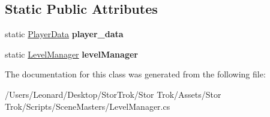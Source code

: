 \subsection*{Static Public Attributes}
\begin{DoxyCompactItemize}
\item 
\mbox{\label{class_level_manager_ad93295bba6b276adfbca309f9ba36c71}} 
static \hyperlink{class_player_data}{Player\+Data} {\bfseries player\+\_\+data}
\item 
\mbox{\label{class_level_manager_a0bf70c0b09f89b936ad4646a0985d8b9}} 
static \hyperlink{class_level_manager}{Level\+Manager} {\bfseries level\+Manager}
\end{DoxyCompactItemize}


The documentation for this class was generated from the following file\+:\begin{DoxyCompactItemize}
\item 
/\+Users/\+Leonard/\+Desktop/\+Stor\+Trok/\+Stor Trok/\+Assets/\+Stor Trok/\+Scripts/\+Scene\+Masters/Level\+Manager.\+cs\end{DoxyCompactItemize}
